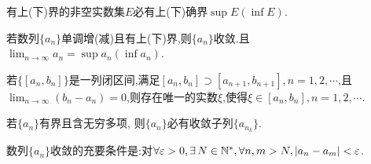 \begin{theorem}
    [确界存在原理] 有上(下)界的非空实数集$E$必有上(下)确界$\sup E(\inf E)$.
\end{theorem}
\begin{theorem}
    [单调有界极限存在准则] 若数列$\{a_n\}$单调增(减)且有上(下)界,则$\{a_n\}$收敛.且$\lim_{n \to \infty} a_n=\sup a_n(\inf a_n)$.
\end{theorem}
\begin{theorem}
    [闭区间套定理] 若$\{[a_n,b_n]\}$是一列闭区间,满足$[a_n,b_n]\supset[a_{n+1},b_{n+1}],n=1,2,\cdots$,且$\lim_{n \to \infty} (b_n-a_n)=0$,则存在唯一的实数$\xi$,使得$\xi \in [a_n,b_n],n=1,2,\cdots$.
\end{theorem}
\begin{theorem}
    [列紧性原理] \label{theorem:Heine-Borel Theorem} 若$\{a_n\}$有界且含无穷多项, 则$\{a_n\}$必有收敛子列$\{a_{n_k}\}$.
\end{theorem}
\begin{theorem}
    [柯西(Cauchy)准则] 数列$\{a_n\}$收敛的充要条件是:对$\forall \ve >0, \exists N\in \mathbb{N}^*, \forall n,m>N, |a_n-a_m|<\ve$.
\end{theorem}

